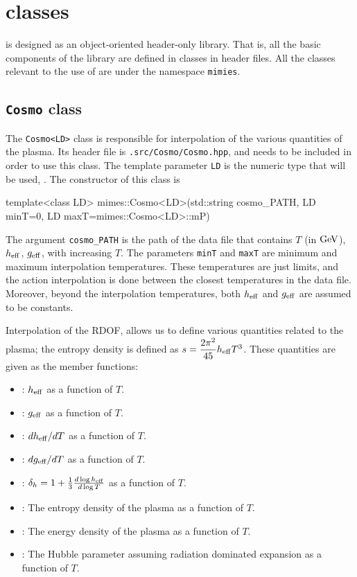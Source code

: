 \documentclass[11pt,a4paper]{article}
\begin{document}
\section{\CPP classes}\label{app:classes}
\setcounter{equation}{0}
%
\mimes is designed as an object-oriented header-only library. That is, all the basic components of the library are defined in classes in header files. All the classes relevant to the use of \mimes are under the namespace {\tt mimies}.

\subsection{{\tt Cosmo} class}
%
The {\tt Cosmo<LD>} class is responsible for interpolation of the various quantities of the plasma. Its header file is {\tt \mimes.src/Cosmo/Cosmo.hpp}, and needs to be included in order to use this class. The template parameter {\tt LD} is the numeric type that will be used, . The constructor of this class is
%
\begin{cpp}
	template<class LD>
	mimes::Cosmo<LD>(std::string cosmo_PATH, LD minT=0, LD maxT=mimes::Cosmo<LD>::mP)
\end{cpp}
%
The argument {\tt cosmo\_PATH} is the path of the data file that contains $T$ (in ${\rm GeV}$), $h_{\rm eff}{}$, $g_{\rm eff}{}$, with increasing $T$. The parameters {\tt minT} and {\tt maxT} are minimum and maximum interpolation temperatures. These temperatures are just limits, and the action interpolation is done between the closest temperatures in the data file. Moreover, beyond the interpolation temperatures, both $h_{\rm eff}{}$ and $g_{\rm eff}{}$ are assumed to be constants.   

Interpolation of the RDOF, allows us to define various quantities related to the plasma; \eg the entropy density is defined as $s = \dfrac{2\pi^2}{45} h_{\rm eff}{} T^3$. These quantities are given as the member functions:
%
\begin{itemize}
	\item {}: $h_{\rm eff}{}$ as a function of $T$.
	\item {}: $g_{\rm eff}{}$ as a function of $T$.
	\item {}: $dh_{\rm eff}{}/dT$ as a function of $T$.
	\item {}: $dg_{\rm eff}{}/dT$ as a function of $T$.
	\item {}: $\delta_h = 1 + \frac{1}{3} \frac{d\log h_{\rm eff}{}}{d\log T}$ as a function of $T$.
	\item {}: The entropy density of the plasma as a function of $T$.
	\item {}: The energy density of the plasma as a function of $T$.
	\item {}: The Hubble parameter assuming radiation dominated expansion as a function of $T$.
\end{itemize}
\end{document}
